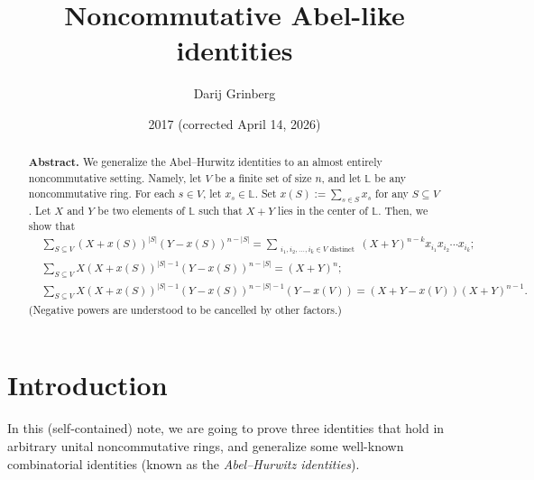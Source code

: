 \documentclass[numbers=enddot,12pt,final,onecolumn,notitlepage]{scrartcl}%
\theoremstyle{definition}
\let\sumnonlimits\sum
\renewcommand{\sum}{\sumnonlimits\limits}
\begin{document}
\title{Noncommutative Abel-like identities}
\author{Darij Grinberg}
\date{2017 (corrected April 14, 2026) }
\maketitle

\begin{abstract}
\textbf{Abstract.} We generalize the Abel--Hurwitz identities to an almost
entirely noncommutative setting. Namely, let $V$ be a finite set of size $n$,
and let $\mathbb{L}$ be any noncommutative ring. For each $s\in V$, let
$x_{s}\in\mathbb{L}$. Set $x\left(  S\right)  :=\sum_{s\in S}x_{s}$ for any
$S\subseteq V$. Let $X$ and $Y$ be two elements of $\mathbb{L}$ such that
$X+Y$ lies in the center of $\mathbb{L}$. Then, we show that%
\begin{align*}
&  \sum_{S\subseteq V}\left(  X+x\left(  S\right)  \right)  ^{\left\vert
S\right\vert }\left(  Y-x\left(  S\right)  \right)  ^{n-\left\vert
S\right\vert }=\sum_{\substack{i_{1},i_{2},\ldots,i_{k}\in V\text{ distinct}%
}}\left(  X+Y\right)  ^{n-k}x_{i_{1}}x_{i_{2}}\cdots x_{i_{k}};\\
&  \sum_{S\subseteq V}X\left(  X+x\left(  S\right)  \right)  ^{\left\vert
S\right\vert -1}\left(  Y-x\left(  S\right)  \right)  ^{n-\left\vert
S\right\vert }=\left(  X+Y\right)  ^{n};\\
&  \sum_{S\subseteq V}X\left(  X+x\left(  S\right)  \right)  ^{\left\vert
S\right\vert -1}\left(  Y-x\left(  S\right)  \right)  ^{n-\left\vert
S\right\vert -1}\left(  Y-x\left(  V\right)  \right)  =\left(  X+Y-x\left(
V\right)  \right)  \left(  X+Y\right)  ^{n-1}.
\end{align*}
(Negative powers are understood to be cancelled by other factors.)

\end{abstract}
\tableofcontents

\section{Introduction}

In this (self-contained) note, we are going to prove three identities that
hold in arbitrary unital noncommutative rings, and generalize some well-known
combinatorial identities (known as the \textit{Abel--Hurwitz identities}).
\end{document}
